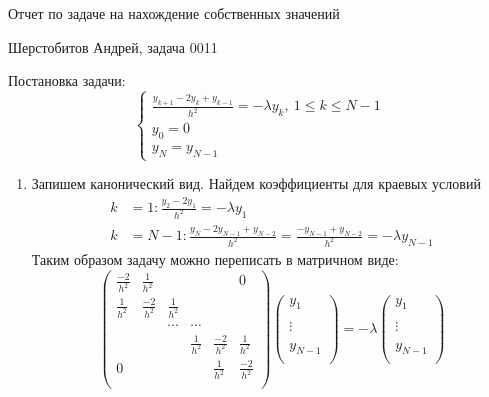\documentclass[12pt]{article}
\begin{document}
\begin{center}
Отчет по задаче на нахождение собственных значений
\end{center}
\begin{center}
Шерстобитов Андрей, задача 0011
\end{center}
Постановка задачи:
\[\begin{cases}
    \frac{y_{k+1}-2y_k+y_{k-1}}{h^2} = -\lambda y_k,\ 1 \leq k \leq N-1 \\
    y_0 = 0 \\
    y_N = y_{N-1}
\end{cases}\]
\begin{enumerate}
    \item Запишем канонический вид. Найдем коэффициенты для краевых условий
    \begin{align*}
        k &= 1: \frac{y_2 - 2y_1}{h^2} = -\lambda y_1 \\
        k &= N-1: \frac{y_N - 2y_{N-1}+y_{N-2}}{h^2} = \frac{-y_{N-1} + y_{N-2}}{h^2} = -\lambda y_{N-1}
    \end{align*}
    Таким образом задачу можно переписать в матричном виде:
    \[\left(\begin{array}{cccccc}
        \frac{-2}{h^2}& \frac{1}{h^2}  &&&& 0 \\
        \frac{1}{h^2} & \frac{-2}{h^2} & \frac{1}{h^2} &&& \\
        &&\cdots&\cdots&& \\
        &&& \frac{1}{h^2} & \frac{-2}{h^2} & \frac{1}{h^2} \\
        0 &&&               & \frac{1}{h^2}  & \frac{-2}{h^2} \\
    \end{array}\right)
    \left(\begin{array}{c}
        y_{1}\\
        \\
        \vdots\\
        \\
        y_{N-1}\\
    \end{array}\right)
    =
    -\lambda
    \left(\begin{array}{c}
        y_{1}\\
        \\
        \vdots\\
        \\
        y_{N-1}\\
    \end{array}\right)
    \]


\end{enumerate}
\end{document}
